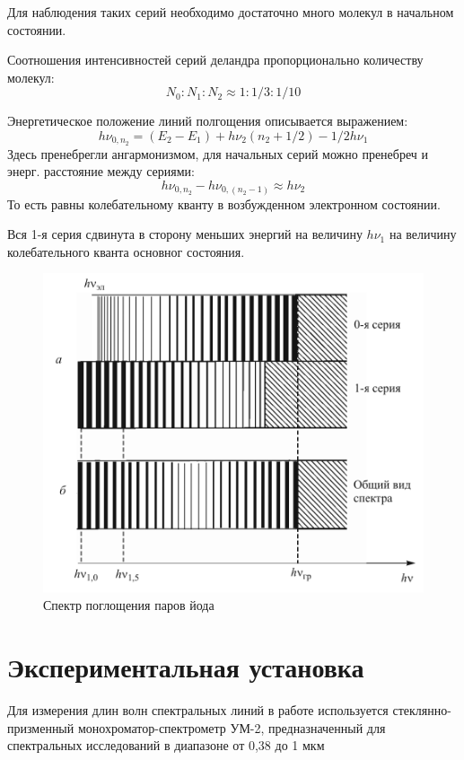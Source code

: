 \documentclass[a4paper]{article}
\begin{document}
Для наблюдения таких серий необходимо достаточно много молекул в начальном состоянии.\par

Соотношения интенсивностей серий деландра пропорционально количеству молекул:
$$N_0 : N_1 : N_2 \approx 1 : 1/3 : 1/10$$

Энергетическое положение линий полгощения описывается выражением:
$$h\nu_{0,n_2} = (E_2 - E_1) + h\nu_2 (n_2+1/2) - 1/2 h\nu_1$$
Здесь пренебрегли ангармонизмом, для начальных серий можно пренебреч и энерг. расстояние между сериями:
$$h\nu_{0,n_2} - h\nu_{0,(n_2 - 1)} \approx h\nu_2$$
То есть равны колебательному кванту в возбужденном электронном состоянии.\par

Вся 1-я серия сдвинута в сторону меньших энергий на величину $h\nu_1$ на величину колебательного кванта основног состояния.

\begin{figure}[H]
    \begin{center}
    \includegraphics[scale = 0.38]{p6.png}
    \caption{Спектр поглощения паров йода}
    \label{p6}
    \end{center}
\end{figure}


\section{Экспериментальная установка}
Для измерения длин волн спектральных линий в работе используется стеклянно-призменный 
монохроматор-спектрометр УМ-2, предназначенный для спектральных исследований в диапазоне 
от 0,38 до 1 мкм
\end{document}
